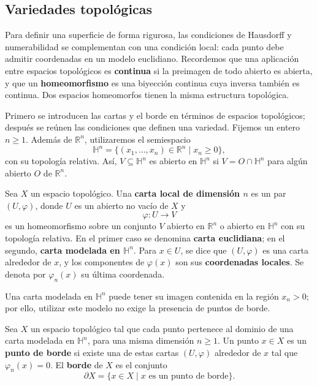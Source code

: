 \subsection{Variedades topológicas}

Para definir una superficie de forma rigurosa, las condiciones de Hausdorff y numerabilidad se complementan con una condición local: cada punto debe admitir coordenadas en un modelo euclidiano. Recordemos que una aplicación entre espacios topológicos es \textbf{continua} si la preimagen de todo abierto es abierta, y que un \textbf{homeomorfismo} es una biyección continua cuya inversa también es continua. Dos espacios homeomorfos tienen la misma estructura topológica.

Primero se introducen las cartas y el borde en términos de espacios topológicos; después se reúnen las condiciones que definen una variedad. Fijemos un entero $n\geq1$. Además de $\mathbb{R}^n$, utilizaremos el semiespacio
\[
\mathbb{H}^n=\{(x_1,\ldots,x_n)\in\mathbb{R}^n\mid x_n\geq0\},
\]
con su topología relativa. Así, $V\subseteq\mathbb{H}^n$ es abierto en $\mathbb{H}^n$ si $V=O\cap\mathbb{H}^n$ para algún abierto $O$ de $\mathbb{R}^n$.

\begin{definition}
\label{def:carta-local}
Sea $X$ un espacio topológico. Una \textbf{carta local de dimensión $n$} es un par $(U,\varphi)$, donde $U$ es un abierto no vacío de $X$ y
\[
\varphi:U\longrightarrow V
\]
es un homeomorfismo sobre un conjunto $V$ abierto en $\mathbb{R}^n$ o abierto en $\mathbb{H}^n$ con su topología relativa. En el primer caso se denomina \textbf{carta euclidiana}; en el segundo, \textbf{carta modelada en $\mathbb{H}^n$}. Para $x\in U$, se dice que $(U,\varphi)$ es una carta alrededor de $x$, y los componentes de $\varphi(x)$ son sus \textbf{coordenadas locales}. Se denota por $\varphi_n(x)$ su última coordenada.
\end{definition}

Una carta modelada en $\mathbb{H}^n$ puede tener su imagen contenida en la región $x_n>0$; por ello, utilizar este modelo no exige la presencia de puntos de borde.

\begin{definition}[Borde]
\label{def:borde}
Sea $X$ un espacio topológico tal que cada punto pertenece al dominio de una carta modelada en $\mathbb{H}^n$, para una misma dimensión $n\geq1$. Un punto $x\in X$ es un \textbf{punto de borde} si existe una de estas cartas $(U,\varphi)$ alrededor de $x$ tal que $\varphi_n(x)=0$. El \textbf{borde} de $X$ es el conjunto
\[
\partial X=\{x\in X\mid x\text{ es un punto de borde}\}.
\]
\end{definition}

